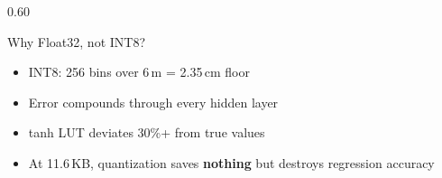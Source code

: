 \documentclass[
	11pt,
	aspectratio=169,
]{beamer}
\begin{document}
\begin{frame}
\begin{columns}[c]
\begin{column}{0.60\textwidth}
			\smallskip
			\begin{alertblock}{Why Float32, not INT8?}
				\begin{itemize}
					\item INT8: 256 bins over 6\,m = 2.35\,cm floor
					\item Error \alert{compounds} through every hidden layer
					\item tanh LUT deviates 30\%+ from true values
					\item At 11.6\,KB, quantization saves \textbf{nothing} but destroys regression accuracy
				\end{itemize}
			\end{alertblock}
		\end{column}
	\end{columns}
\end{frame}

\end{document}
